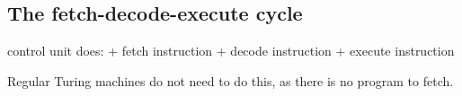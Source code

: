 
\subsection{The fetch-decode-execute cycle}

control unit does:
+ fetch instruction
+ decode instruction
+ execute instruction

Regular Turing machines do not need to do this, as there is no program to fetch.

